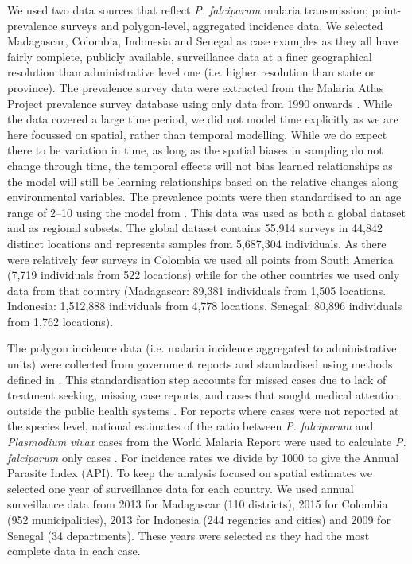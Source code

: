 \documentclass[review]{elsarticle}
\begin{document}
We used two data sources that reflect \emph{P. falciparum} malaria transmission; point-prevalence surveys and polygon-level, aggregated incidence data. 
We selected Madagascar, Colombia, Indonesia and Senegal as case examples as they all have fairly complete, publicly available, surveillance data at a finer geographical resolution than administrative level one (i.e. higher resolution than state or province).
The prevalence survey data were extracted from the Malaria Atlas Project prevalence survey database using only data from 1990 onwards \citep{bhatt2015effect, guerra2007assembling, pfeffer2018ma}.
While the data covered a large time period, we did not model time explicitly as we are here focussed on spatial, rather than temporal modelling.
While we do expect there to be variation in time, as long as the spatial biases in sampling do not change through time, the temporal effects will not bias learned relationships as the model will still be learning relationships based on the relative changes along environmental variables.
The prevalence points were then standardised to an age range of 2--10 using the model from \citep{smith2007standardizing}.
This data was used as both a global dataset and as regional subsets.
The global dataset contains 55,914 surveys in 44,842 distinct locations and represents samples from 5,687,304 individuals.
As there were relatively few surveys in Colombia we used all points from South America (7,719 individuals from 522 locations) while for the other countries we used only data from that country (Madagascar: 89,381 individuals from 1,505 locations. Indonesia: 1,512,888 individuals from 4,778 locations. Senegal: 80,896 individuals from 1,762 locations).


The polygon incidence data (i.e. malaria incidence aggregated to administrative units) were collected from government reports \citep{mdg, sen, col, idn} and standardised using methods defined in \cite{cibulskis2011worldwide}.
This standardisation step accounts for missed cases due to lack of treatment seeking, missing case reports, and cases that sought medical attention outside the public health systems \citep{battle2016treatment}.
For reports where cases were not reported at the species level, national estimates of the ratio between \emph{P. falciparum} and \emph{Plasmodium vivax} cases from the World Malaria Report were used to calculate \emph{P. falciparum} only cases \citep{world2016world}. 
For incidence rates we divide by 1000 to give the Annual Parasite Index (API).
To keep the analysis focused on spatial estimates we selected one year of surveillance data for each country. 
We used annual surveillance data from 2013 for Madagascar (110 districts), 2015 for Colombia (952 municipalities), 2013 for Indonesia (244 regencies and cities) and 2009 for Senegal (34 departments).
These years were selected as they had the most complete data in each case.
\end{document}
